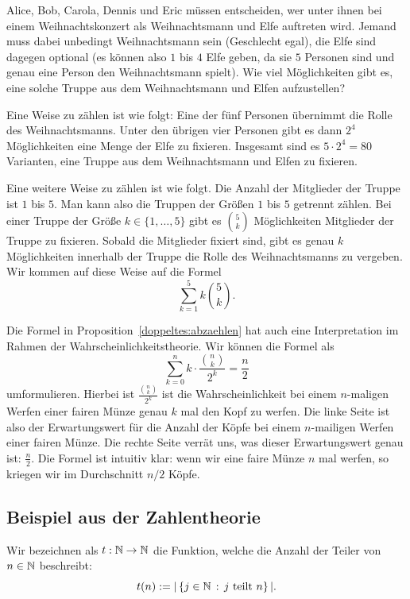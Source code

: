 \begin{bsp}
	Alice, Bob, Carola, Dennis und Eric müssen entscheiden, wer unter ihnen bei einem Weihnachtskonzert als Weihnachtsmann und Elfe auftreten wird.  Jemand  muss dabei unbedingt Weihnachtsmann sein (Geschlecht egal), die Elfe sind dagegen optional (es können also $1$ bis $4$ Elfe geben, da sie $5$ Personen sind und genau eine Person den Weihnachtsmann spielt). Wie viel Möglichkeiten gibt es, eine solche Truppe aus dem Weihnachtsmann und Elfen  aufzustellen?  
	
	Eine Weise zu zählen ist wie folgt: Eine der fünf Personen übernimmt die Rolle des Weihnachtsmanns. Unter den übrigen vier Personen gibt es dann $2^4$ Möglichkeiten eine Menge der Elfe zu fixieren. Insgesamt sind es $5 \cdot 2^4 = 80$ Varianten, eine Truppe aus dem Weihnachtsmann und Elfen zu fixieren. 
	
	Eine weitere Weise zu zählen ist wie folgt. Die Anzahl der Mitglieder der Truppe ist $1$ bis $5$. Man kann also die Truppen der Größen $1$ bis $5$ getrennt zählen. Bei einer Truppe der Größe $k \in \{1,\ldots,5\}$ gibt es $\binom{5}{k}$ Möglichkeiten Mitglieder der Truppe zu fixieren. Sobald die Mitglieder fixiert sind, gibt es genau $k$ Möglichkeiten innerhalb der Truppe die Rolle des Weihnachtsmanns zu vergeben. Wir kommen auf diese Weise auf  die Formel
	\[
			\sum_{k=1}^5 k \binom{5}{k}. 
	\]
\end{bsp} 

\begin{bem}
	Die Formel in Proposition~\ref{doppeltes:abzaehlen} hat auch eine Interpretation im Rahmen der Wahrscheinlichkeitstheorie. Wir können die Formel als 
	\[
		\sum_{k=0}^n k \cdot \frac{\binom{n}{k}}{2^k} =  \frac{n}{2}
	\]
	umformulieren. Hierbei ist $\frac{\binom{n}{k}}{2^k}$ ist die Wahrscheinlichkeit bei einem $n$-maligen Werfen einer fairen Münze genau $k$ mal den Kopf zu werfen. Die linke Seite ist also der Erwartungswert für die Anzahl der Köpfe bei einem $n$-mailigen Werfen einer fairen Münze. Die rechte Seite verrät uns, was dieser Erwartungswert genau ist: $\frac{n}{2}$. Die Formel ist intuitiv klar: wenn wir eine faire Münze $n$ mal werfen, so kriegen wir im Durchschnitt $n/2$ Köpfe. 
\end{bem} 

\subsection{Beispiel aus der Zahlentheorie} 

\begin{defn}
	Wir bezeichnen als $t : \mathbb{N} \to \mathbb{N}$ die Funktion, welche die Anzahl der Teiler von $n \in \mathbb{N}$ beschreibt:
	\[
			t(n) := | \setcond{j \in \N}{j  \ \text{teilt} \ n} |.
	\]
\end{defn}

